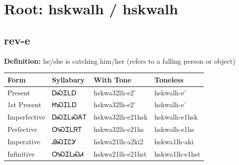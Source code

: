 \documentclass{article}%
\begin{document}
%
\normalsize%
\section*{Root: hskwalh / hskwalh}%
\subsection*{rev-e}%
\textbf{Definition: }%
he/she is catching him/her (refers to a falling person or object)%
\\[0.5em]%
\begin{tabular}{|l|l|l|l|}%
\hline%
\textbf{Form}&\textbf{Syllabary}&\textbf{With Tone}&\textbf{Toneless}\\%
\hline%
Present&ᎠᏍᏆᏞᎠ&hskwa32lh{-}e2'&hskwalh{-}e'\\%
1st Present&ᏥᏍᏆᏞᎠ&hskwa32lh{-}e2'&hskwalh{-}e'\\%
Imperfective&ᎠᏍᏆᏞᏍᎪᎢ&hskwa32lh{-}e21hsk&hskwalh{-}e1hsk\\%
Perfective&ᎤᏍᏆᏞᏒᎢ&hskwa32lh{-}e21hs&hskwalh{-}e1hs\\%
Imperative&ᎯᏍᏆᏝᎩ&hskwa21lh{-}a2ki2&hskwa1lh{-}aki\\%
Infinitive&ᎤᏍᏆᏞᏍᏗ&hskwa21lh{-}e21hst&hskwa1lh{-}e1hst\\%
\hline%
\end{tabular}%
\\[1em]%
\end{document}
